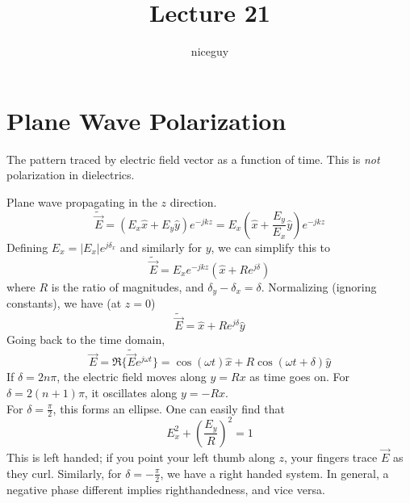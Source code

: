 \documentclass[12pt]{article}
\title{Lecture 21}
\author{niceguy}
\begin{document}
\maketitle

\section{Plane Wave Polarization}

\begin{defn}[Polarization]
    The pattern traced by electric field vector as a function of time. This is \textit{not} polarization in dielectrics.
\end{defn}

\begin{ex}
    Plane wave propagating in the $z$ direction.
    $$\tilde{\vec E} = (E_x\hat x + E_y\hat y)e^{-jkz} = E_x\left(\hat x + \frac{E_y}{E_x}\hat y\right)e^{-jkz}$$
    Defining $E_x = |E_x|e^{j\delta_x}$ and similarly for $y$, we can simplify this to
    $$\tilde{\vec E} = E_xe^{-jkz}\left(\hat x + Re^{j\delta}\right)$$
    where $R$ is the ratio of magnitudes, and $\delta_y - \delta_x = \delta$. Normalizing (ignoring constants), we have (at $z=0$)
    $$\tilde{\vec E} = \hat x + Re^{j\delta}\hat y$$
    Going back to the time domain,
    $$\vec E = \Re\{\tilde{\vec E}e^{j\omega t}\} = \cos(\omega t)\hat x + R\cos(\omega t + \delta)\hat y$$
    If $\delta = 2n\pi$, the electric field moves along $y = Rx$ as time goes on. For $\delta = 2(n+1)\pi$, it oscillates along $y = -Rx$. \\
    For $\delta = \frac{\pi}{2}$, this forms an ellipse. One can easily find that
    $$E_x^2 + \left(\frac{E_y}{R}\right)^2 = 1$$
    This is left handed; if you point your left thumb along $z$, your fingers trace $\vec E$ as they curl. Similarly, for $\delta = -\frac{\pi}{2}$, we have a right handed system. In general, a negative phase different implies righthandedness, and vice versa.
\end{ex}
\end{document}
